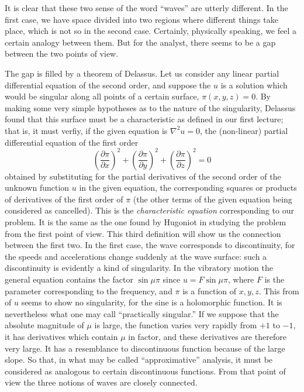 \documentclass[12pt,oneside]{book}
\begin{document}
It is clear that these two sense of the word ``waves'' are utterly different. In the first case, we have space divided into two regions where different things take place, which is not so in the second case. Certainly, physically speaking, we feel a certain analogy between them. But for the analyst, there seems to be a gap between the two points of view. \par

The gap is filled by a theorem of Delassus. Let us consider any linear partial differential equation of the second order, and suppose the $u$ is a solution which would be singular along all points of a certain surface, $\pi(x,y,z)=0$. By making some very simple hypotheses as to the nature of the singularity, Delassus found that this surface must be a characteristic as defined in our first lecture; that is, it must verfiy, if the given equation is $\nabla^2u=0$, the (non-linear) partial differential equation of the first order
$$\left(\frac{\partial\pi}{\partial x}\right)^2+\left(\frac{\partial\pi}{\partial y}\right)^2+\left(\frac{\partial\pi}{\partial z}\right)^2=0$$
obtained by substituting for the partial derivatives of the second order of the unknown function $u$ in the given equation, the corresponding squares or products of derivatives of the first order of $\pi$ (the other terms of the given equation being considered as cancelled). This is the \textit{characteristic equation} corresponding to our problem. It is the same as the one found by Hugoniot in studying the problem from the first point of view. This third definition will show us the connection between the first two. In the first case, the wave corresponds to discontinuity, for the speeds and accelerations change suddenly at the wave surface: such a discontinuity is evidently a kind of singularity. In the vibratory motion the general equation contains the factor $\sin\mu\pi$ since $u=F\sin\mu\pi$, where $F$ is the parameter corresponding to the frequency, and $\pi$ is a function of $x,y,z$. This from of $u$ seems to show no singularity, for the sine is a holomorphic function. It is nevertheless what one may call ``practically singular.'' If we suppose that the absolute magnitude of $\mu$ is large, the function varies very rapidly from $+1$ to $-1$, it has derivatives which contain $\mu$ in factor, and these derivatives are therefore very large. It has a resemblance to discontinuous function because of the large slope. So that, in what may be called ``approximative'' analysis, it must be considered as analogous to certain discontinuous functions. From that point of view the three notions of waves are closely connected. \par
\end{document}
